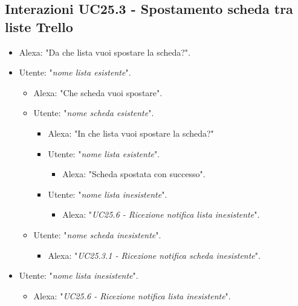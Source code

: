 \subsection{Interazioni  UC25.3 - Spostamento scheda tra liste Trello}
\label{sec:connettore_trello_sposta_scheda}
 \begin{itemize}
        \item Alexa: "Da che lista vuoi spostare la scheda?".
        \item Utente: "{\it nome lista esistente}".
        \begin{itemize}
        \item Alexa: "Che scheda vuoi spostare".
       
        \item Utente: "{\it nome scheda esistente}".
        \begin{itemize}
        \item Alexa: "In che lista vuoi spostare la scheda?"
          \item Utente: "{\it nome lista esistente}".
          \begin{itemize}
              \item Alexa: "Scheda spostata con successo".
          \end{itemize}
           \item Utente: "{\it nome lista inesistente}".
           \begin{itemize}
        \item Alexa: "{\it UC25.6 - Ricezione notifica lista inesistente}".
        \end{itemize}
      \end{itemize}
      
     \item Utente: "{\it nome scheda inesistente}".
     \begin{itemize}
           \item Alexa: "{\it UC25.3.1 - Ricezione notifica scheda inesistente}".
           \end{itemize}
            \end{itemize}
        \item Utente: "{\it nome lista inesistente}".
           \begin{itemize}
        \item Alexa: "{\it UC25.6 - Ricezione notifica lista inesistente}".
           \end{itemize}
    \end{itemize}
